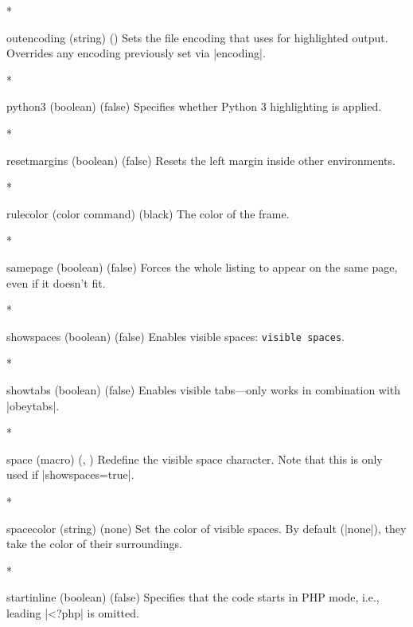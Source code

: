 \begin{paracol}{2}
\begin{optionlist}
    \switchcolumn[0]*%
  \item[outencoding (string) (\meta{system-specific})]
    Sets the file encoding that  uses for highlighted output.  Overrides any encoding previously set via |encoding|.
    \switchcolumn

\switchcolumn[0]*%
  \item[python3 (boolean) (false)] 
    Specifies whether Python 3 highlighting is applied.
    \switchcolumn

\switchcolumn[0]*%
  \item[resetmargins (boolean) (false)]
    Resets the left margin inside other environments.
    \switchcolumn

\switchcolumn[0]*%
  \item[rulecolor (color command) (black)]
    The color of the frame.
    \switchcolumn

\switchcolumn[0]*%
  \item[samepage (boolean) (false)]
    Forces the whole listing to appear on the same page, even if it doesn't fit.
    \switchcolumn

\switchcolumn[0]*%
  \item[showspaces (boolean) (false)]
    Enables visible spaces: \verb*/visible spaces/.
    \switchcolumn

\switchcolumn[0]*%
  \item[showtabs (boolean) (false)]
    Enables visible tabs---only works in combination with |obeytabs|.
    \switchcolumn

    \switchcolumn[0]*%

\item[space (macro) (\string\textvisiblespace, \textvisiblespace)]
Redefine the visible space character.  Note that this is only used if |showspaces=true|.
\switchcolumn

\switchcolumn[0]*%

\item[spacecolor (string) (none)]
Set the color of visible spaces.  By default (|none|), they take the color of their surroundings.
\switchcolumn

\switchcolumn[0]*%

  \item[startinline (boolean) (false)] 
    Specifies that the code starts in PHP mode, i.e., leading |<?php| is omitted.
    \switchcolumn


\end{optionlist}
\end{paracol}
